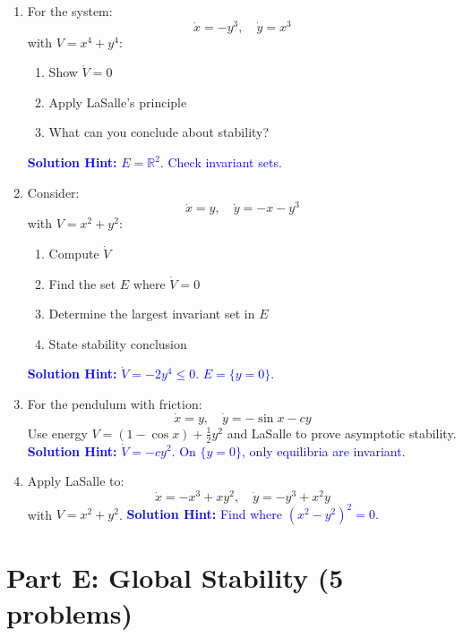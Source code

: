 \documentclass[12pt]{article}
\newcommand{\solution}[1]{\textcolor{blue}{\textbf{Solution Hint:} #1}}
\begin{document}
\begin{enumerate}[resume]
\item For the system:
$$\dot{x} = -y^3, \quad \dot{y} = x^3$$
with $V = x^4 + y^4$:
\begin{enumerate}[label=(\alph*)]
    \item Show $\dot{V} = 0$
    \item Apply LaSalle's principle
    \item What can you conclude about stability?
\end{enumerate}
\solution{$E = \mathbb{R}^2$. Check invariant sets.}

\item Consider:
$$\dot{x} = y, \quad \dot{y} = -x - y^3$$
with $V = x^2 + y^2$:
\begin{enumerate}[label=(\alph*)]
    \item Compute $\dot{V}$
    \item Find the set $E$ where $\dot{V} = 0$
    \item Determine the largest invariant set in $E$
    \item State stability conclusion
\end{enumerate}
\solution{$\dot{V} = -2y^4 \leq 0$. $E = \{y = 0\}$.}

\item For the pendulum with friction:
$$\dot{x} = y, \quad \dot{y} = -\sin x - cy$$
Use energy $V = (1-\cos x) + \frac{1}{2}y^2$ and LaSalle to prove asymptotic stability.
\solution{$\dot{V} = -cy^2$. On $\{y=0\}$, only equilibria are invariant.}

\item Apply LaSalle to:
$$\dot{x} = -x^3 + xy^2, \quad \dot{y} = -y^3 + x^2y$$
with $V = x^2 + y^2$.
\solution{Find where $(x^2-y^2)^2 = 0$.}
\end{enumerate}

\section*{Part E: Global Stability (5 problems)}
\end{document}
